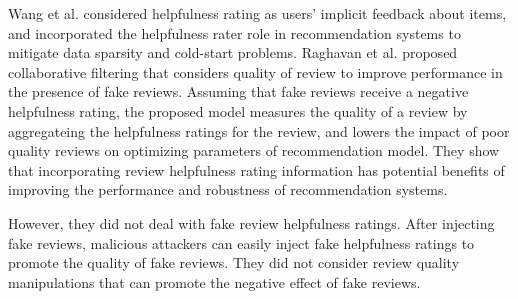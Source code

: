 \documentclass[master,english,final]{kaist-ucs}
\begin{document}
Wang et al. \cite{DualRole} considered helpfulness rating as users’ implicit feedback about items, and  incorporated the helpfulness rater role in recommendation systems to mitigate data sparsity and cold-start problems.
Raghavan et al. \cite{RQMF} proposed collaborative filtering that considers quality of review to improve performance in the presence of fake reviews.
Assuming that fake reviews receive a negative helpfulness rating, the proposed model measures the quality of a review by aggregateing the helpfulness ratings for the review, and lowers the impact of poor quality reviews on optimizing parameters of recommendation model.
They show that incorporating review helpfulness rating information has potential benefits of improving the performance and robustness of recommendation systems.

However, they did not deal with fake review helpfulness ratings.
After injecting fake reviews, malicious attackers can easily inject fake helpfulness ratings to promote the quality of fake reviews.
They did not consider review quality manipulations that can promote the negative effect of fake reviews.
\end{document}
